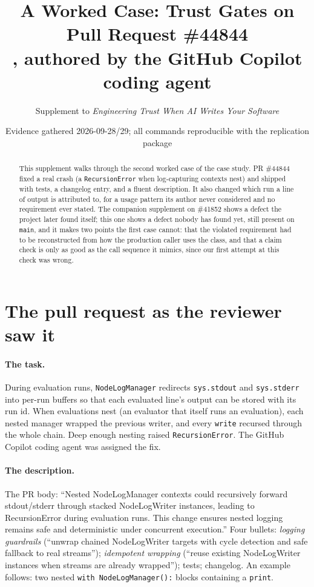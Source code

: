 \documentclass[11pt,a4paper]{article}
\title{A Worked Case: Trust Gates on Pull Request \#44844\\
\large \code{Azure/azure-sdk-for-python}, authored by the GitHub Copilot coding agent}
\author{Supplement to \emph{Engineering Trust When AI Writes Your Software}}
\date{Evidence gathered 2026-09-28/29; all commands reproducible with the replication package}
\newcommand{\code}[1]{\texttt{#1}}
\begin{document}
\maketitle

\begin{abstract}
\noindent This supplement walks through the second worked case of the case study. PR \#44844 fixed a real crash (a \code{RecursionError} when log-capturing contexts nest) and shipped with tests, a changelog entry, and a fluent description. It also changed which run a line of output is attributed to, for a usage pattern its author never considered and no requirement ever stated. The companion supplement on \#41852 shows a defect the project later found itself; this one shows a defect nobody has found yet, still present on \code{main}, and it makes two points the first case cannot: that the violated requirement had to be reconstructed from how the production caller uses the class, and that a claim check is only as good as the call sequence it mimics, since our first attempt at this check was wrong.
\end{abstract}

\section{The pull request as the reviewer saw it}

\paragraph{The task.} During evaluation runs, \code{NodeLogManager} redirects \code{sys.stdout} and \code{sys.stderr} into per-run buffers so that each evaluated line's output can be stored with its run id. When evaluations nest (an evaluator that itself runs an evaluation), each nested manager wrapped the previous writer, and every \code{write} recursed through the whole chain. Deep enough nesting raised \code{RecursionError}. The GitHub Copilot coding agent was assigned the fix.

\paragraph{The description.} The PR body: ``Nested NodeLogManager contexts could recursively forward stdout/stderr through stacked NodeLogWriter instances, leading to RecursionError during evaluation runs. This change ensures nested logging remains safe and deterministic under concurrent execution.'' Four bullets: \emph{logging guardrails} (``unwrap chained NodeLogWriter targets with cycle detection and safe fallback to real streams''); \emph{idempotent wrapping} (``reuse existing NodeLogWriter instances when streams are already wrapped''); tests; changelog. An example follows: two nested \code{with NodeLogManager():} blocks containing a \code{print}.
\end{document}
